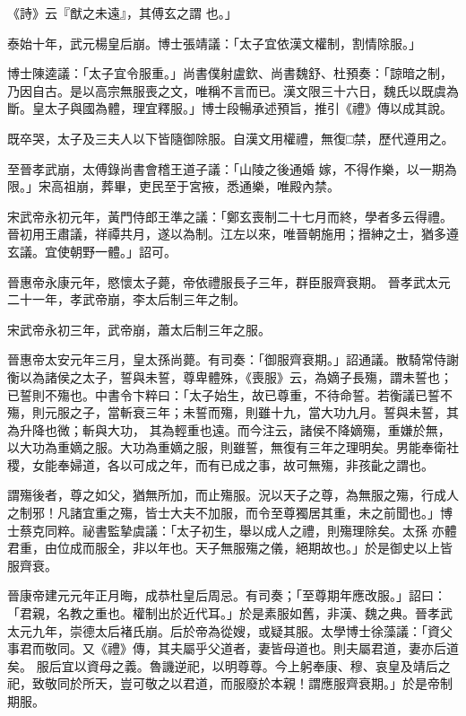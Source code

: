 \begin{pinyinscope}
 《詩》云『猷之未遠』，其傅玄之謂
 也。」



 泰始十年，武元楊皇后崩。博士張靖議：「太子宜依漢文權制，割情除服。」



 博士陳逵議：「太子宜令服重。」尚書僕射盧欽、尚書魏舒、杜預奏：「諒暗之制，乃因自古。是以高宗無服喪之文，唯稱不言而已。漢文限三十六日，魏氏以既虞為斷。皇太子與國為體，理宜釋服。」博士段暢承述預旨，推引《禮》傳以成其說。



 既卒哭，太子及三夫人以下皆隨御除服。自漢文用權禮，無復□禁，歷代遵用之。



 至晉孝武崩，太傅錄尚書會稽王道子議：「山陵之後通婚
 嫁，不得作樂，以一期為限。」宋高祖崩，葬畢，吏民至于宮掖，悉通樂，唯殿內禁。



 宋武帝永初元年，黃門侍郎王準之議：「鄭玄喪制二十七月而終，學者多云得禮。晉初用王肅議，祥禫共月，遂以為制。江左以來，唯晉朝施用；搢紳之士，猶多遵玄議。宜使朝野一體。」詔可。



 晉惠帝永康元年，愍懷太子薨，帝依禮服長子三年，群臣服齊衰期。
 晉孝武太元二十一年，孝武帝崩，李太后制三年之制。



 宋武帝永初三年，武帝崩，蕭太后制三年之服。



 晉惠帝太安元年三月，皇太孫尚薨。有司奏：「御服齊衰期。」詔通議。散騎常侍謝衡以為諸侯之太子，誓與未誓，尊卑體殊，《喪服》云，為嫡子長殤，謂未誓也；已誓則不殤也。中書令卞粹曰：「太子始生，故已尊重，不待命誓。若衡議已誓不殤，則元服之子，當斬衰三年；未誓而殤，則雖十九，當大功九月。誓與未誓，其為升降也微；斬與大功，
 其為輕重也遠。而今注云，諸侯不降嫡殤，重嫌於無，以大功為重嫡之服。大功為重嫡之服，則雖誓，無復有三年之理明矣。男能奉衛社稷，女能奉婦道，各以可成之年，而有已成之事，故可無殤，非孩齔之謂也。



 謂殤後者，尊之如父，猶無所加，而止殤服。況以天子之尊，為無服之殤，行成人之制邪！凡諸宜重之殤，皆士大夫不加服，而令至尊獨居其重，未之前聞也。」博士蔡克同粹。祕書監摯虞議：「太子初生，舉以成人之禮，則殤理除矣。太孫
 亦體君重，由位成而服全，非以年也。天子無服殤之儀，絕期故也。」於是御史以上皆服齊衰。



 晉康帝建元元年正月晦，成恭杜皇后周忌。有司奏；「至尊期年應改服。」詔曰：「君親，名教之重也。權制出於近代耳。」於是素服如舊，非漢、魏之典。晉孝武太元九年，崇德太后褚氏崩。后於帝為從嫂，或疑其服。太學博士徐藻議：「資父事君而敬同。又《禮》傳，其夫屬乎父道者，妻皆母道也。則夫屬君道，妻亦后道矣。
 服后宜以資母之義。魯譏逆祀，以明尊尊。今上躬奉康、穆、哀皇及靖后之祀，致敬同於所天，豈可敬之以君道，而服廢於本親！謂應服齊衰期。」於是帝制期服。




\end{pinyinscope}
